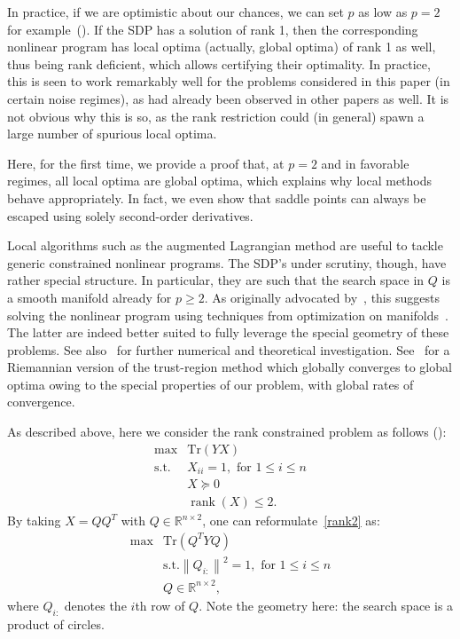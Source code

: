 \documentclass{colt2016} %
\newcommand{\trace}{\mathrm{Tr}}
\newcommand{\rank}{\operatorname{rank}}
\newcommand{\1}{\mathbf{1}}
\newcommand{\RR}{\mathbb{R}}
\begin{document}
In practice, if we are optimistic about our chances, we can set $p$ as low as $p=2$ for example~(\cite{burer2002rank}). If the SDP has a solution of rank 1, then the corresponding nonlinear program has local optima (actually, global optima) of rank 1 as well, thus being rank deficient, which allows certifying their optimality. In practice, this is seen to work remarkably well for the problems considered in this paper (in certain noise regimes), as had already been observed in other papers as well. It is not obvious why this is so, as the rank restriction could (in general) spawn a large number of spurious local optima.

Here, for the first time, we provide a proof that, at $p=2$ and in favorable regimes, all local optima are global optima, which explains why local methods behave appropriately. In fact, we even show that saddle points can always be escaped using solely second-order derivatives.

Local algorithms such as the augmented Lagrangian method are useful to tackle generic constrained nonlinear programs. The SDP's under scrutiny, though, have rather special structure. In particular, they are such that the search space in $Q$ is a smooth manifold already for $p\geq 2$. As originally advocated by~\cite{journee2010low}, this suggests solving the nonlinear program using techniques from optimization on manifolds~\citep{AMS08}. The latter are indeed better suited to fully leverage the special geometry of these problems. See also~\citep{wen2013orthogonality,boumal2015staircase} for further numerical and theoretical investigation.
See~\citep{boumal2016complexity} for a Riemannian version of the trust-region method which globally converges to global optima owing to the special properties of our problem, with global rates of convergence.

As described above, here we consider the rank constrained problem as follows (\cite{burer2002rank}):
\begin{equation}\label{rank2}
\begin{array}{ll}
\max & \trace\left( YX \right) \\
\text{s.t.} & X_{ii} = 1, \text{ for } 1\leq i \leq n\\ 
 & X \succeq 0 \\
 & \rank(X) \leq 2. 
\end{array}
\end{equation}
By taking $X = QQ^T$ with $Q\in\RR^{n\times 2}$, one can reformulate~\eqref{rank2} as:
\begin{equation}\label{rank2BM}
\begin{array}{ll}
\max & \trace\left( Q^TYQ \right) \\
 & \text{s.t.} \left\|Q_{i:}\right\|^2 = 1, \text{ for } 1\leq i \leq n \\
 & Q \in \RR^{n \times 2},  
\end{array}
\end{equation}
where $Q_{i:}$ denotes the $i$th row of $Q$. Note the geometry here: the search space is a product of circles.
\end{document}
